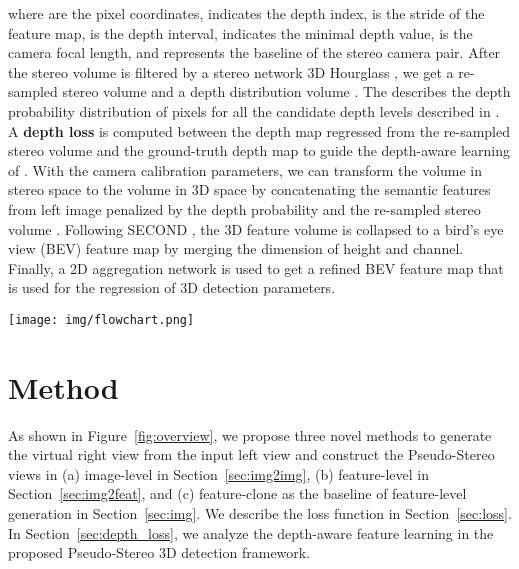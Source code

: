 \documentclass[10pt,twocolumn,letterpaper]{article}
\begin{document}
where  are the pixel coordinates,  indicates the depth index,  is the stride of the feature map,  is the depth interval,  indicates the minimal depth value,  is the camera focal length, and  represents the baseline of the stereo camera pair. 
After the stereo volume  is filtered by a stereo network 3D Hourglass \cite{guo2021liga}, we get a re-sampled stereo volume  and a depth distribution volume . The  describes the depth probability distribution of pixels for all the candidate depth levels described in . A \textbf{depth loss} is computed between the depth map regressed from the re-sampled stereo volume  and the ground-truth depth map to guide the depth-aware learning of . With the camera calibration parameters, we can transform the volume in stereo space  to the volume in 3D space  by concatenating the semantic features from left image penalized by the depth probability  and the re-sampled stereo volume . 
Following SECOND \cite{yan2018second}, the 3D feature volume  is collapsed to a bird's eye view (BEV) feature map  by merging the dimension of height and channel. Finally, a 2D aggregation network is used to get a refined BEV feature map  that is used for the regression of 3D detection parameters.

\begin{figure*}[t!]
  \centering
 \texttt{[image: img/flowchart.png]}
\vspace{-6mm}
  \caption{ Overview of our virtual view generation methods: (a) Image-level that uses the generated disparity map for forward warping the input left image into a virtual right image, (b) Feature-level that converts the left features into virtual right features via the proposed disparity-wise dynamic convolution (DDC), (c) Feature-clone that simply duplicates the left features as the virtual right features.
} 
 \label{fig:overview}
\vspace{-3mm}
\end{figure*} 

\section{Method}
As shown in Figure~\ref{fig:overview}, we propose three novel methods to generate the virtual right view from the input left view and construct the Pseudo-Stereo views in (a) image-level in Section~\ref{sec:img2img}, (b) feature-level in Section~\ref{sec:img2feat}, and (c) feature-clone as the baseline of feature-level generation in Section~\ref{sec:img}. We describe the loss function in Section~\ref{sec:loss}. In Section~\ref{sec:depth_loss}, we analyze the depth-aware feature learning in the proposed Pseudo-Stereo 3D detection framework.
\end{document}
